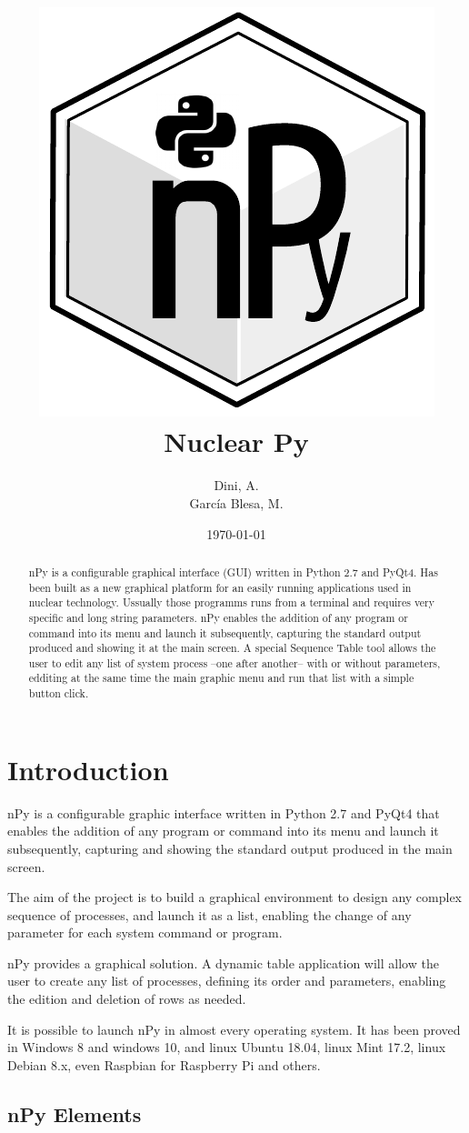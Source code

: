 \documentclass[a4paper,10pt]{article}
\author{Dini, A. \\García Blesa, M.}%
\date{\today}%
\title{\includegraphics[scale=0.5]{img/nPyLogo.pdf}\\\textbf{Nuclear Py}}%
\begin{document}
\maketitle

\begin{abstract}
nPy is a configurable graphical interface (GUI) written in Python 2.7 and PyQt4. Has been built as a new graphical platform for an easily running applications used in nuclear technology. Ussually those programms runs from a terminal and requires very specific and long string parameters. nPy enables the addition of any program or command into its menu and launch it subsequently, capturing the standard output produced and showing it at the main screen. A special Sequence Table tool allows the user to edit any list of system process --one after another-- with or without parameters, edditing at the same time the main graphic menu and run that list with a simple button click.
\end{abstract}
\newpage

\tableofcontents
\newpage

\section{Introduction}

nPy is a configurable graphic interface written in Python 2.7 and PyQt4 that enables the addition of any program or command into its menu and launch it subsequently, capturing and showing the standard output produced in the main screen.

The aim of the project is to build a graphical environment to design any complex sequence of processes, and launch it as a list, enabling the change of any parameter for each system command or program.

nPy provides a graphical solution. A dynamic table application will allow the user to create any list of processes, defining its order and parameters, enabling the edition and deletion of rows as needed.

It is possible to launch nPy in almost every operating system. It has been proved in Windows 8 and windows 10, and linux Ubuntu 18.04, linux Mint 17.2, linux Debian 8.x, even Raspbian for Raspberry Pi and others.

\subsection{nPy Elements}
\end{document}
